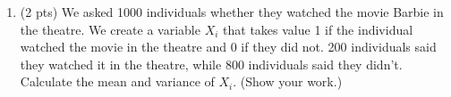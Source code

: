 \documentclass{./../../Latex/handout}
\begin{document}
\begin{enumerate}
\item (2 pts) We asked 1000 individuals whether they watched the movie Barbie in the theatre. We create a variable $X_i$ that takes value 1 if the individual watched the movie in the theatre and 0 if they did not. 200 individuals said they watched it in the theatre, while 800 individuals said they didn’t. Calculate the mean and variance of $X_i$. (Show your work.) 
\end{enumerate}
\end{document}
